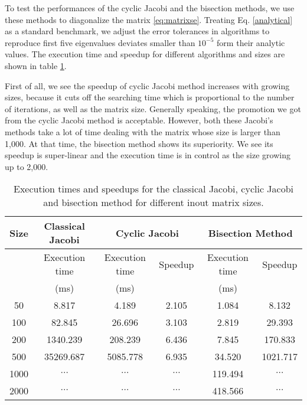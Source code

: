 
To test the performances of the cyclic Jacobi and the bisection methods, we use these methods to diagonalize the matrix \ref{eq:matrixse}. 
Treating Eq. \ref{analytical} as a standard benchmark, we adjust the error tolerances in algorithms to reproduce first five eigenvalues deviates smaller than $10^{-5}$ form their analytic values. 
The execution time and speedup for different algorithms and sizes are shown in table \ref{bisectiontab}. 

First of all, we see the speedup of cyclic Jacobi method increases with growing sizes, 
because it cuts off the searching time which is proportional to the number of iterations, as well as the matrix size. 
Generally speaking, the promotion we got from the cyclic Jacobi method is acceptable. 
However, both these Jacobi's methods take a lot of time dealing with the matrix whose size is larger than 1,000.
At that time, the bisection method shows its superiority. 
We see its speedup is super-linear and the execution time is in control as the size growing up to 2,000.
\begin{table}[tb]
\centering
\caption{Execution times and speedups for the classical Jacobi, cyclic Jacobi and bisection method for different inout matrix sizes.}
\label{bisectiontab}
\begin{tabular}{cccccc}
\hline
\hline
Size & Classical Jacobi & \multicolumn{2}{c}{Cyclic Jacobi} & \multicolumn{2}{c}{Bisection Method} \\
 \hline
     & Execution time   & Execution time       & Speedup     & Execution time    & Speedup  \\
     &(ms)   & (ms)      &     &(ms)   &  \\
 \hline
50   & 8.817            & 4.189               & 2.105       & 1.084            & 8.132      \\
100  & 82.845           & 26.696              & 3.103       & 2.819            & 29.393     \\
200  & 1340.239         & 208.239             & 6.436       & 7.845            & 170.833    \\
500  & 35269.687        & 5085.778            & 6.935       & 34.520           & 1021.717   \\
1000 &$\cdots$                  &$\cdots$                     &$\cdots$             & 119.494          &$\cdots$            \\
2000 &$\cdots$                  &$\cdots$                     &$\cdots$             & 418.566          & $\cdots$           \\
\hline
\hline
\end{tabular}
\end{table}
